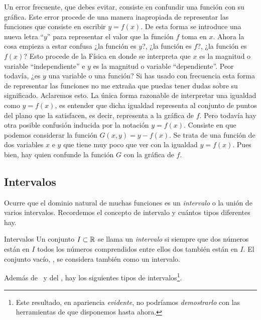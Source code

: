 Un error \marginpar{\flushright\curvasr} frecuente, que debes evitar,
consiste en confundir una función con su gráfica. Este error procede
de una manera inapropiada de representar las funciones que consiste
en escribir $y=f(x)$. De esta forma se introduce una nueva letra
``$y$'' para representar el valor que la función $f$ toma en $x$.
Ahora la cosa empieza a estar confusa ¿la función es $y$?, ¿la función
es $f$?, ¿la función es $f(x)$? Esto procede de la Física en donde
se interpreta que $x$ es la magnitud o variable ``independiente''
e $y$ es la magnitud o variable ``dependiente''. Peor todavía,
¿es $y$ una variable o una función? Si has usado con frecuencia esta
forma de representar las funciones no me extraña que puedas tener
dudas sobre su significado. Aclaremos esto. La única forma razonable
de interpretar una igualdad como $y=f(x)$, es entender que dicha
igualdad representa al conjunto de puntos del plano que la satisfacen,
es decir, representa a la gráfica de $f$. Pero todavía hay otra posible
confusión inducida por la notación $y=f(x)$. Consiste en que podemos
considerar la función $G(x,y)=y-f(x)$. Se trata de una función de
dos variables $x$ e $y$ que tiene muy poco que ver con la igualdad
$y=f(x)$. Pues bien, hay quien confunde la función $G$ con la gráfica
de $f$.

\subsection{Intervalos}

Ocurre que el dominio natural de muchas funciones es un \emph{intervalo}
o la unión de varios intervalos. Recordemos el concepto de intervalo
y cuántos tipos diferentes hay.

\begin{defi}{Intervalos}{}\label{definicionintervalo} Un conjunto
$I\subset\mathbb R$ se llama un \emph{intervalo} si siempre que dos números
están en $I$ todos los números comprendidos entre ellos dos también
están en $I$. El conjunto vacío, \vac, se considera también como
un intervalo. \end{defi}

Además de \R\ y del \vac, hay los siguientes tipos de intervalos\footnote{Este resultado, en apariencia \emph{evidente}, no podríamos \emph{demostrarlo}
con las herramientas de que disponemos hasta ahora.}.


